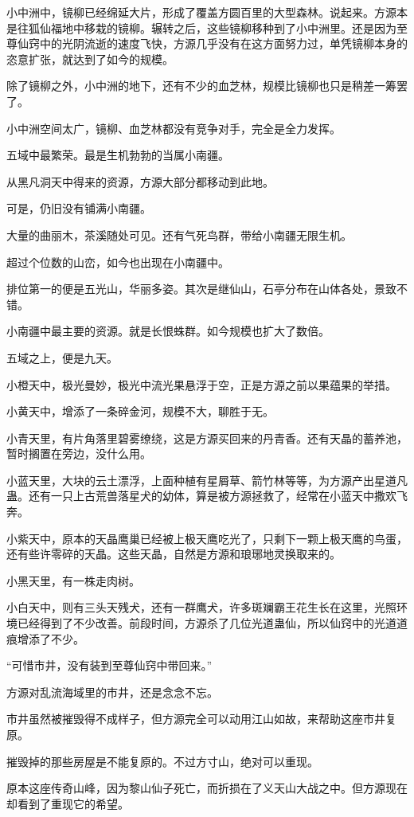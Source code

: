\begin{this_body}
小中洲中，镜柳已经绵延大片，形成了覆盖方圆百里的大型森林。说起来。方源本是往狐仙福地中移栽的镜柳。辗转之后，这些镜柳移种到了小中洲里。还是因为至尊仙窍中的光阴流逝的速度飞快，方源几乎没有在这方面努力过，单凭镜柳本身的恣意扩张，就达到了如今的规模。

除了镜柳之外，小中洲的地下，还有不少的血芝林，规模比镜柳也只是稍差一筹罢了。

小中洲空间太广，镜柳、血芝林都没有竞争对手，完全是全力发挥。

五域中最繁荣。最是生机勃勃的当属小南疆。

从黑凡洞天中得来的资源，方源大部分都移动到此地。

可是，仍旧没有铺满小南疆。

大量的曲丽木，茶溪随处可见。还有气死鸟群，带给小南疆无限生机。

超过个位数的山峦，如今也出现在小南疆中。

排位第一的便是五光山，华丽多姿。其次是继仙山，石亭分布在山体各处，景致不错。

小南疆中最主要的资源。就是长恨蛛群。如今规模也扩大了数倍。

五域之上，便是九天。

小橙天中，极光曼妙，极光中流光果悬浮于空，正是方源之前以果蕴果的举措。

小黄天中，增添了一条碎金河，规模不大，聊胜于无。

小青天里，有片角落里碧雾缭绕，这是方源买回来的丹青香。还有天晶的蓄养池，暂时搁置在旁边，没什么用。

小蓝天里，大块的云土漂浮，上面种植有星屑草、箭竹林等等，为方源产出星道凡蛊。还有一只上古荒兽落星犬的幼体，算是被方源拯救了，经常在小蓝天中撒欢飞奔。

小紫天中，原本的天晶鹰巢已经被上极天鹰吃光了，只剩下一颗上极天鹰的鸟蛋，还有些许零碎的天晶。这些天晶，自然是方源和琅琊地灵换取来的。

小黑天里，有一株走肉树。

小白天中，则有三头天残犬，还有一群鹰犬，许多斑斓霸王花生长在这里，光照环境已经得到了不少改善。前段时间，方源杀了几位光道蛊仙，所以仙窍中的光道道痕增添了不少。

“可惜市井，没有装到至尊仙窍中带回来。”

方源对乱流海域里的市井，还是念念不忘。

市井虽然被摧毁得不成样子，但方源完全可以动用江山如故，来帮助这座市井复原。

摧毁掉的那些房屋是不能复原的。不过方寸山，绝对可以重现。

原本这座传奇山峰，因为黎山仙子死亡，而折损在了义天山大战之中。但方源现在却看到了重现它的希望。


\end{this_body}
